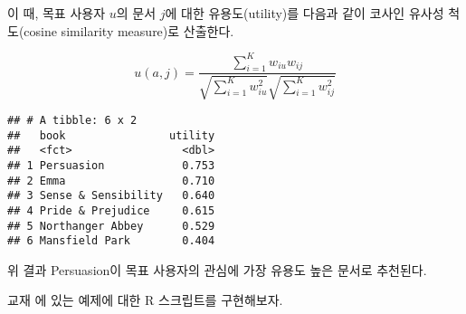 \documentclass[]{book}
\newenvironment{Shaded}{\begin{snugshade}}{\end{snugshade}}
\newcommand{\DataTypeTok}[1]{\textcolor[rgb]{0.13,0.29,0.53}{#1}}
\newcommand{\DecValTok}[1]{\textcolor[rgb]{0.00,0.00,0.81}{#1}}
\newcommand{\KeywordTok}[1]{\textcolor[rgb]{0.13,0.29,0.53}{\textbf{#1}}}
\newcommand{\NormalTok}[1]{#1}
\newcommand{\OperatorTok}[1]{\textcolor[rgb]{0.81,0.36,0.00}{\textbf{#1}}}
\newcommand{\StringTok}[1]{\textcolor[rgb]{0.31,0.60,0.02}{#1}}
\begin{document}
이 때, 목표 사용자 \(u\)의 문서 \(j\)에 대한 유용도(utility)를 다음과 같이 코사인 유사성 척도(cosine similarity measure)로 산출한다.

\begin{equation*}
u(a, j) = \frac{\sum_{i = 1}^{K} w_{iu} w_{ij}}{\sqrt{\sum_{i = 1}^{K} w_{iu}^2} \sqrt{\sum_{i = 1}^{K} w_{ij}^2}}
\end{equation*}

\begin{Shaded}
\end{Shaded}

\begin{verbatim}
## # A tibble: 6 x 2
##   book                utility
##   <fct>                 <dbl>
## 1 Persuasion            0.753
## 2 Emma                  0.710
## 3 Sense & Sensibility   0.640
## 4 Pride & Prejudice     0.615
## 5 Northanger Abbey      0.529
## 6 Mansfield Park        0.404
\end{verbatim}

위 결과 Persuasion이 목표 사용자의 관심에 가장 유용도 높은 문서로 추천된다.

교재 \citet{jun2012datamining} 에 있는 예제에 대한 R 스크립트를 구현해보자.
\end{document}
